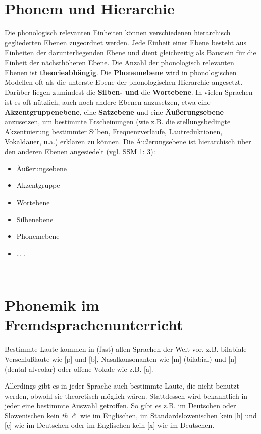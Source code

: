 \documentclass[
  letterpaper,
]{scrbook}
\begin{document}
\hypertarget{phonem-und-hierarchie}{%
\section{Phonem und Hierarchie}\label{phonem-und-hierarchie}}

Die phonologisch relevanten Einheiten können verschiedenen hierarchisch
gegliederten Ebenen zugeordnet werden. Jede Einheit einer Ebene besteht
aus Einheiten der darunterliegenden Ebene und dient gleichzeitig als
Baustein für die Einheit der nächsthöheren Ebene. Die Anzahl der
phonologisch relevanten Ebenen ist \textbf{theorieabhängig}. Die
\textbf{Phonemebene} wird in phonologischen Modellen oft als die
unterste Ebene der phonologischen Hierarchie angesetzt. Darüber liegen
zumindest die \textbf{Silben- und} die \textbf{Wortebene}. In vielen
Sprachen ist es oft nützlich, auch noch andere Ebenen anzusetzen, etwa
eine \textbf{Akzentgruppenebene}, eine \textbf{Satzebene} und eine
\textbf{Äußerungsebene} anzusetzen, um bestimmte Erscheinungen (wie z.B.
die stellungsbedingte Akzentuierung bestimmter Silben, Frequenzverläufe,
Lautreduktionen, Vokaldauer, u.a.) erklären zu können. Die
Äußerungsebene ist hierarchisch über den anderen Ebenen angesiedelt
(vgl. SSM 1: 3):

\begin{itemize}
\item
  Äußerungsebene
\item
  Akzentgruppe
\item
  Wortebene
\item
  Silbenebene
\item
  Phonemebene
\item
  \ldots{} .
\end{itemize}

~

\hypertarget{phonemik-im-fremdsprachenunterricht}{%
\section{Phonemik im
Fremdsprachenunterricht}\label{phonemik-im-fremdsprachenunterricht}}

Bestimmte Laute kommen in (fast) allen Sprachen der Welt vor, z.B.
bilabiale Verschlußlaute wie {[}p{]} und {[}b{]}, Nasalkonsonanten wie
{[}m{]} (bilabial) und {[}n{]} (dental-alveolar) oder offene Vokale wie
z.B. {[}a{]}.

Allerdings gibt es in jeder Sprache auch bestimmte Laute, die nicht
benutzt werden, obwohl sie theoretisch möglich wären. Stattdessen wird
bekanntlich in jeder eine bestimmte Auswahl getroffen. So gibt es z.B.
im Deutschen oder Slowenischen kein \emph{th} {[}đ{]} wie im Englischen,
im Standardslowenischen kein {[}h{]} und {[}ç{]} wie im Deutschen oder
im Englischen kein {[}x{]} wie im Deutschen.
\end{document}
